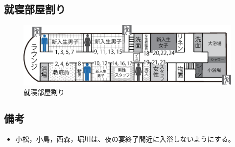 \subsection{就寝部屋割り}
\begin{figure}[H]
\begin{center}
\includegraphics[scale=0.6]{./10/syushin.eps}
\vspace{-45mm}
\caption{就寝部屋割り}
\label{fig:futon_katazuke}
\end{center}
\end{figure}

\subsection{備考}
\begin{itemize}
\item 小松，小島，西森，堀川は、夜の宴終了間近に入浴しないようにする。
\end{itemize}

